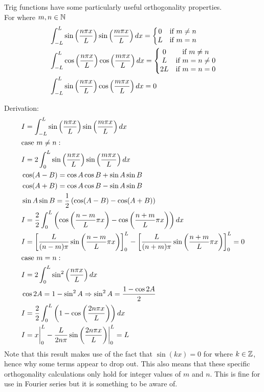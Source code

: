 \documentclass[11pt, fleqn]{article}
\begin{document}
Trig functions have some particularly useful orthogonality properties.\\
For where $m,n\in\mathbb{N}$
\begin{align*}
    &\int_{-L}^L\sin\left( \frac{n\pi x}{L} \right)\sin\left( \frac{m\pi x}{L} \right)dx=\left\{\begin{matrix} 0 & \text{if }m\neq n\\ L & \text{if }m=n \end{matrix}\right.\\
    &\int_{-L}^L\cos\left( \frac{n\pi x}{L} \right)\cos\left( \frac{m\pi x}{L} \right)dx=\left\{\begin{matrix} 0 & \text{if }m\neq n\\ L & \text{if }m=n\neq 0\\ 2L & \text{if }m=n=0 \end{matrix}\right.\\
    &\int_{-L}^L\sin\left( \frac{n\pi x}{L} \right)\cos\left( \frac{m\pi x}{L} \right)dx=0
\end{align*}

Derivation:
\begin{align*}
    &I=\int_{-L}^L\sin\left( \frac{n\pi x}{L} \right)\sin\left( \frac{m\pi x}{L} \right)dx\\
    &\text{case }m\neq n:\\
    &I=2\int_{0}^L\sin\left( \frac{n\pi x}{L} \right)\sin\left( \frac{m\pi x}{L} \right)dx\\
    &\cos(A-B)=\cos A\cos B+\sin A\sin B\\
    &\cos(A+B)=\cos A\cos B-\sin A\sin B\\
    &\sin A\sin B=\frac{1}{2}\left( \cos(A-B)-\cos(A+B) \right)\\
    &I=\frac{2}{2}\int_0^L\left( \cos\left( \frac{n-m}{L}\pi x \right)-\cos\left( \frac{n+m}{L}\pi x \right) \right)dx\\
    &I=\left[ \frac{L}{(n-m)\pi}\sin\left( \frac{n-m}{L}\pi x \right) \right]_0^L-\left[ \frac{L}{(n+m)\pi}\sin\left( \frac{n+m}{L}\pi x \right) \right]_0^L=0\\
    &\text{case }m=n:\\
    &I=2\int_0^L\sin^2\left( \frac{n\pi x}{L} \right)dx\\
    &\cos 2A=1-\sin^2A\Rightarrow \sin^2 A=\frac{1-\cos 2A}{2}\\
    &I=\frac{2}{2}\int_0^L\left( 1-\cos\left( \frac{2n\pi x}{L} \right) \right)dx\\
    &I={x}\bigg\vert_0^L-{\frac{L}{2n\pi}\sin\left( \frac{2n\pi x}{L} \right)}\bigg\vert_0^L=L
\end{align*}
Note that this result makes use of the fact that $\sin(kx)=0$ for where $k\in\mathbb{Z}$, hence why some terms appear to drop out. This also means that these specific orthogonality calculations only hold for integer values of $m$ and $n$. This is fine for use in Fourier series but it is something to be aware of.\\
\end{document}
